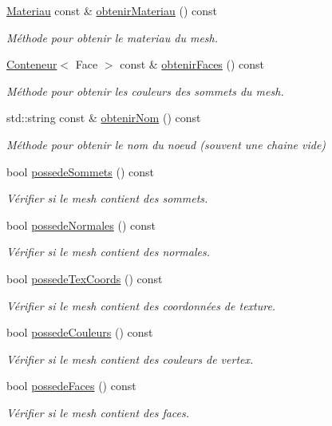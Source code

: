 \begin{DoxyCompactItemize}
\hyperlink{structmodele_1_1_materiau}{Materiau} const \& \hyperlink{classmodele_1_1_mesh_ae072a8706a2a057780de35b4fbed1d19}{obtenir\-Materiau} () const 
\begin{DoxyCompactList}\small\item\em Méthode pour obtenir le materiau du mesh. \end{DoxyCompactList}\item 
\hyperlink{classmodele_1_1_mesh_adbc8897d8cdca4541a2068c874aa54eb}{Conteneur}$<$ Face $>$ const \& \hyperlink{classmodele_1_1_mesh_afd06495e1e6d7e870baf7e20b7862b8d}{obtenir\-Faces} () const 
\begin{DoxyCompactList}\small\item\em Méthode pour obtenir les couleurs des sommets du mesh. \end{DoxyCompactList}\item 
std\-::string const \& \hyperlink{classmodele_1_1_mesh_ad04c281e59a74438cd0f6564743c537b}{obtenir\-Nom} () const 
\begin{DoxyCompactList}\small\item\em Méthode pour obtenir le nom du noeud (souvent une chaine vide) \end{DoxyCompactList}\item 
bool \hyperlink{classmodele_1_1_mesh_aa7ff98102f4e390cd15df6d919474ff8}{possede\-Sommets} () const 
\begin{DoxyCompactList}\small\item\em Vérifier si le mesh contient des sommets. \end{DoxyCompactList}\item 
bool \hyperlink{classmodele_1_1_mesh_aca6001ed3c4bd55f854a442e97ac5258}{possede\-Normales} () const 
\begin{DoxyCompactList}\small\item\em Vérifier si le mesh contient des normales. \end{DoxyCompactList}\item 
bool \hyperlink{classmodele_1_1_mesh_a0ed3db0114de7a7674f252a78b35cad8}{possede\-Tex\-Coords} () const 
\begin{DoxyCompactList}\small\item\em Vérifier si le mesh contient des coordonnées de texture. \end{DoxyCompactList}\item 
bool \hyperlink{classmodele_1_1_mesh_a3655f655ce525b4d7448050a2f6692af}{possede\-Couleurs} () const 
\begin{DoxyCompactList}\small\item\em Vérifier si le mesh contient des couleurs de vertex. \end{DoxyCompactList}\item 
bool \hyperlink{classmodele_1_1_mesh_a542042fa090ce91d6d1858c1be91c5b4}{possede\-Faces} () const 
\begin{DoxyCompactList}\small\item\em Vérifier si le mesh contient des faces. \end{DoxyCompactList}\end{DoxyCompactItemize}


